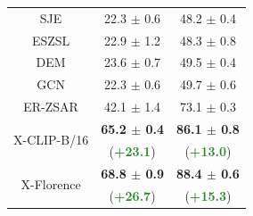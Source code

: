 \begin{table}[t!]
\begin{minipage}{0.48\columnwidth}
{{\begin{tabular}{ccc}
		SJE \cite{akata2015evaluation}  & 22.3 $\pm$ 0.6 & 48.2 $\pm$ 0.4 \\
		ESZSL \cite{romera2015embarrassingly} & 22.9 $\pm$ 1.2 & 48.3 $\pm$ 0.8 \\
		DEM \cite{zhang2017learning}  & 23.6 $\pm$ 0.7 & 49.5 $\pm$ 0.4 \\
		GCN \cite{ghosh2020all}  & 22.3 $\pm$ 0.6 & 49.7 $\pm$ 0.6 \\  
		ER-ZSAR \cite{chen2021elaborative} & 42.1 $\pm$ 1.4 & 73.1 $\pm$ 0.3 \\ \midrule
	    \multirow{2}{*}{X-CLIP-B/16} & \textbf{65.2 $\pm$ 0.4} & \textbf{86.1 $\pm$ 0.8} \\
	    & (\scriptsize\textcolor{ForestGreen}{\textbf{+23.1}}) &  (\scriptsize\textcolor{ForestGreen}{\textbf{+13.0}}) \\
	    \multirow{2}{*}{X-Florence} & \textbf{68.8 $\pm$ 0.9} & \textbf{88.4 $\pm$ 0.6} \\
	    & (\scriptsize\textcolor{ForestGreen}{\textbf{+26.7}}) &  (\scriptsize\textcolor{ForestGreen}{\textbf{+15.3}}) \\
		\bottomrule
	\end{tabular}
	}
}
\label{tab:zeroshot2}

\end{minipage}
\vspace{-.47cm}
\end{table}